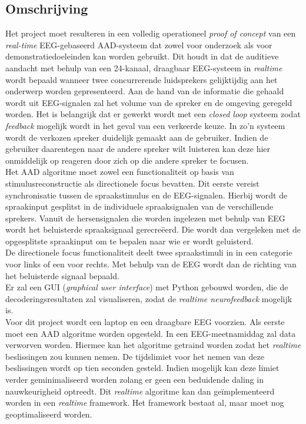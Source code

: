 \documentclass[a4paper,kul]{kulakarticle}
\begin{document}
	\subsection*{Omschrijving}
	Het project moet resulteren in een volledig operationeel \textit{proof of concept} van een \textit{real-time} EEG-gebaseerd AAD-systeem dat zowel voor onderzoek als voor demonstratiedoeleinden kan worden gebruikt. Dit houdt in dat de auditieve aandacht met behulp van een 24-kanaal, draagbaar EEG-systeem in \textit{realtime} wordt bepaald wanneer twee concurrerende luidsprekers gelijktijdig aan het onderwerp worden gepresenteerd. Aan de hand van de informatie die gehaald wordt uit EEG-signalen zal het volume van de spreker en de omgeving geregeld worden. Het is belangrijk dat er gewerkt wordt met een \textit{closed loop} systeem zodat \textit{feedback} mogelijk wordt in het geval van een verkeerde keuze. In zo'n systeem wordt de verkozen spreker duidelijk gemaakt aan de gebruiker. Indien de gebruiker daarentegen naar de andere spreker wilt luisteren kan deze hier onmiddelijk op reageren door zich op die andere spreker te focusen. \\
	Het AAD algoritme moet zowel een functionaliteit op basis van stimulusreconstructie als directionele focus bevatten. Dit eerste vereist synchronisatie tussen de spraakstimulus en de EEG-signalen. Hierbij wordt de spraakinput gesplitst in de individuele spraaksignalen van de verschillende sprekers. Vanuit de hersensignalen die worden ingelezen met behulp van EEG wordt het beluisterde spraaksignaal gerecreëerd. Die wordt dan vergeleken met de opgesplitste spraakinput om te bepalen naar wie er wordt geluisterd.\\
	De directionele focus functionaliteit deelt twee spraakstimuli in in een categorie voor links of een voor rechts. Met behulp van de EEG wordt dan de richting van het beluisterde signaal bepaald.\\ %
	Er zal een GUI (\textit{graphical user interface}) met Python gebouwd worden, die de decoderingsresultaten zal visualiseren, zodat de \textit{realtime neurofeedback} mogelijk is.\\
	Voor dit project wordt een laptop en een draagbare EEG voorzien. Als eerste moet een AAD algoritme worden opgesteld. In een EEG-meetnamiddag zal data verworven worden. Hiermee kan het algoritme getraind worden zodat het \textit{realtime} beslissingen zou kunnen nemen. De tijdslimiet voor het nemen van deze beslissingen wordt op tien seconden gesteld. Indien mogelijk kan deze limiet verder geminimaliseerd worden zolang er geen een beduidende daling in nauwkeurigheid optreedt. Dit \textit{realtime} algoritme kan dan geïmplementeerd worden in een \textit{realtime} framework. Het framework bestaat al, maar moet nog geoptimaliseerd worden.\\
\end{document}
